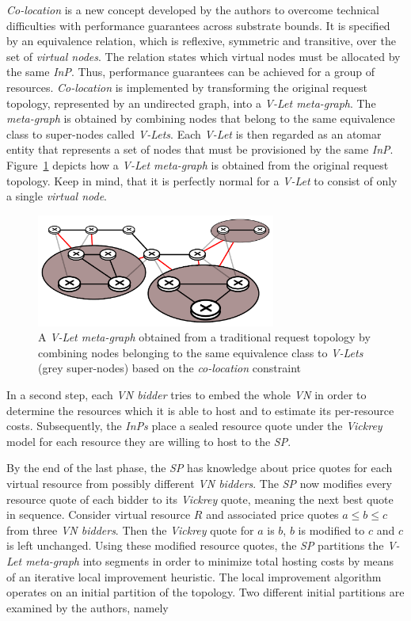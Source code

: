 \documentclass[prodmode,acmtomccap]{acmlarge}
\begin{document}
\emph{Co-location} is a new concept developed by the authors to overcome technical difficulties with
performance guarantees across substrate bounds. It is specified by an equivalence relation, which is reflexive, symmetric and transitive, over the set of \emph{virtual nodes}. The relation
states which virtual nodes must be allocated by the same \emph{InP}. Thus, performance guarantees can be achieved for a group of resources. 
\emph{Co-location} is implemented by transforming the original request topology, represented by an undirected graph, into a \emph{V-Let meta-graph}. The \emph{meta-graph} is obtained
by combining nodes that belong to the same equivalence class to super-nodes called \emph{V-Lets}. Each \emph{V-Let} is then regarded as an atomar entity that represents a set of nodes that must
be provisioned by the same \emph{InP}. Figure~\ref{fig8} depicts how a \emph{V-Let meta-graph} is obtained from the original request topology. Keep in mind, that it is perfectly normal for a \emph{V-Let}
to consist of only a single \emph{virtual node}.

\begin{figure}[htb]
	\centering
	\includegraphics[width=0.7\textwidth]{colocation}
	\caption{A \emph{V-Let meta-graph} obtained from a traditional request topology by combining nodes belonging to the same equivalence class to \emph{V-Lets} (grey super-nodes) based on the
		\emph{co-location} constraint}
	\label{fig8}
\end{figure}

In a second step, each \emph{VN bidder} tries to embed the whole \emph{VN} in order to determine the resources which it is able to host and to estimate its per-resource costs. Subsequently, 
the \emph{InPs} place a sealed resource quote under the \emph{Vickrey} model for each resource they are willing to host to the \emph{SP}.

By the end of the last phase, the \emph{SP} has knowledge about price quotes for each virtual resource from possibly different \emph{VN bidders}. The \emph{SP} now modifies every
resource quote of each bidder to its \emph{Vickrey} quote, meaning the next best quote in sequence. Consider virtual resource $R$ and associated price quotes $a \leq b \leq c$ from three \emph{VN bidders}.
Then the \emph{Vickrey} quote for $a$ is $b$, $b$ is modified to $c$ and $c$ is left unchanged.
Using these modified resource quotes, the \emph{SP} partitions the \emph{V-Let meta-graph} into segments
in order to minimize total hosting costs by means of an iterative local improvement heuristic. The local improvement algorithm operates on an initial partition of the topology. Two different initial partitions are
examined by the authors, namely
\end{document}
